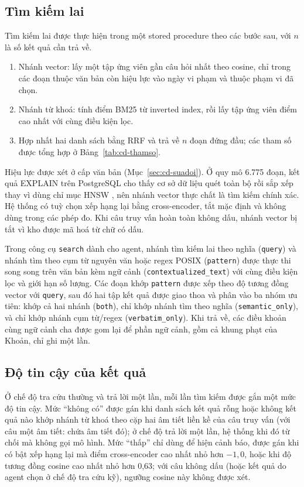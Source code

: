 \subsection{Tìm kiếm lai}

Tìm kiếm lai được thực hiện trong một stored procedure theo các bước sau, với $n$ là số kết quả cần trả về.

\begin{enumerate}
    \item Nhánh vector: lấy một tập ứng viên gần câu hỏi nhất theo cosine, chỉ trong các đoạn thuộc văn bản còn hiệu lực vào ngày vi phạm và thuộc phạm vi đã chọn.
    \item Nhánh từ khoá: tính điểm BM25 \cite{robertson2009bm25} từ inverted index, rồi lấy tập ứng viên điểm cao nhất với cùng điều kiện lọc.
    \item Hợp nhất hai danh sách bằng RRF \cite{cormack2009rrf} và trả về $n$ đoạn đứng đầu; các tham số được tổng hợp ở Bảng~\ref{tab:cd-thamso}.
\end{enumerate}

Hiệu lực được xét ở cấp văn bản (Mục~\ref{sec:cd-suadoi}). Ở quy mô 6.775 đoạn, kết quả EXPLAIN trên PostgreSQL cho thấy cơ sở dữ liệu quét toàn bộ rồi sắp xếp thay vì dùng chỉ mục HNSW \cite{malkov2020hnsw}, nên nhánh vector thực chất là tìm kiếm chính xác. Hệ thống có tuỳ chọn xếp hạng lại bằng cross-encoder, tắt mặc định và không dùng trong các phép đo. Khi câu truy vấn hoàn toàn không dấu, nhánh vector bị tắt vì kho được mã hoá từ chữ có dấu.

Trong công cụ \texttt{search} dành cho agent, nhánh tìm kiếm lai theo nghĩa (\texttt{query}) và nhánh tìm theo cụm từ nguyên văn hoặc regex POSIX (\texttt{pattern}) được thực thi song song trên văn bản kèm ngữ cảnh (\texttt{contextualized\_text}) với cùng điều kiện lọc và giới hạn số lượng. Các đoạn khớp \texttt{pattern} được xếp theo độ tương đồng vector với \texttt{query}, sau đó hai tập kết quả được giao thoa và phân vào ba nhóm ưu tiên: khớp cả hai nhánh (\texttt{both}), chỉ khớp nhánh tìm theo nghĩa (\texttt{semantic\_only}), và chỉ khớp nhánh cụm từ/regex (\texttt{verbatim\_only}). Khi trả về, các điều khoản cùng ngữ cảnh cha được gom lại để phần ngữ cảnh, gồm cả khung phạt của Khoản, chỉ ghi một lần.

\subsection{Độ tin cậy của kết quả}

Ở chế độ tra cứu thường và trả lời một lần, mỗi lần tìm kiếm được gắn một mức độ tin cậy. Mức ``không có'' được gán khi danh sách kết quả rỗng hoặc không kết quả nào khớp nhánh từ khoá theo cặp hai âm tiết liền kề của câu truy vấn (với câu một âm tiết: chứa âm tiết đó); ở chế độ trả lời một lần, hệ thống khi đó từ chối mà không gọi mô hình. Mức ``thấp'' chỉ dùng để hiện cảnh báo, được gán khi có bật xếp hạng lại mà điểm cross-encoder cao nhất nhỏ hơn $-1{,}0$, hoặc khi độ tương đồng cosine cao nhất nhỏ hơn 0,63; với câu không dấu (hoặc kết quả do agent chọn ở chế độ tra cứu kỹ), ngưỡng cosine này không được xét.

